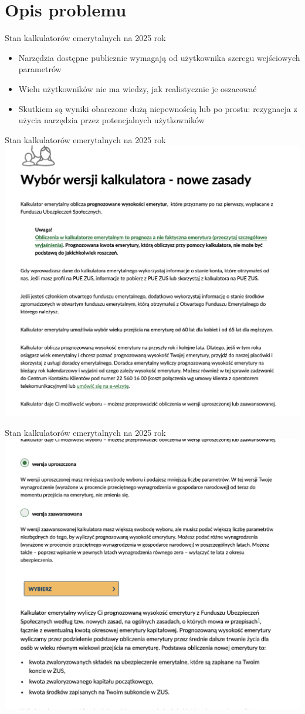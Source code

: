 \section{Opis problemu}

\begin{frame}[t]{Stan kalkulatorów emerytalnych na 2025 rok}
\begin{itemize}
  \item Narzędzia dostępne publicznie wymagają od użytkownika szeregu wejściowych parametrów
  \pause
  \item Wielu użytkowników nie ma wiedzy, jak realistycznie je oszacować
  \pause
  \item Skutkiem są wyniki obarczone dużą niepewnością lub po prostu: rezygnacja
  z użycia narzędzia przez potencjalnych użytkowników
\end{itemize}
\end{frame}

\begin{frame}[t]{Stan kalkulatorów emerytalnych na 2025 rok}
\includegraphics[width=.8\textwidth]{img/zus_calculator_01}
\end{frame}

\begin{frame}[t]{Stan kalkulatorów emerytalnych na 2025 rok}
\includegraphics[width=.8\textwidth]{img/zus_calculator_02}
\end{frame}

